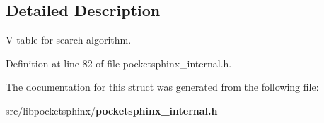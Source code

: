 \subsection{Detailed Description}
V-\/table for search algorithm. 

Definition at line 82 of file pocketsphinx\-\_\-internal.\-h.



The documentation for this struct was generated from the following file\-:\begin{DoxyCompactItemize}
\item 
src/libpocketsphinx/{\bf pocketsphinx\-\_\-internal.\-h}\end{DoxyCompactItemize}
